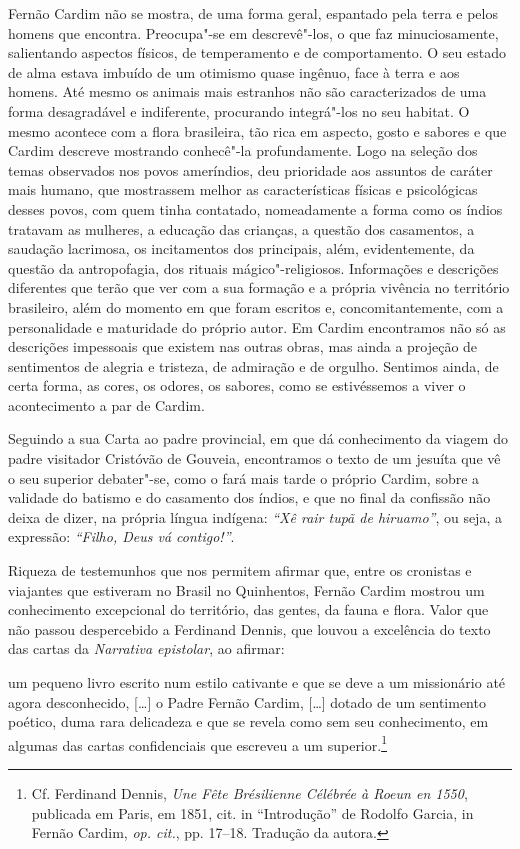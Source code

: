 Fernão Cardim não se mostra, de uma forma geral, espantado pela terra
e pelos homens que encontra. Preocupa"-se em descrevê"-los, o que faz
minuciosamente, salientando aspectos físicos, de temperamento e de
comportamento. O seu estado de alma estava imbuído de um otimismo
quase ingênuo, face à terra e aos homens. Até mesmo os animais mais
estranhos não são caracterizados de uma forma desagradável e
indiferente, procurando integrá"-los no seu habitat. O mesmo acontece
com a flora brasileira, tão rica em aspecto, gosto e sabores e que
Cardim descreve mostrando conhecê"-la profundamente. Logo na seleção
dos temas observados nos povos ameríndios, deu prioridade aos assuntos
de caráter mais humano, que mostrassem melhor as características
físicas e psicológicas desses povos, com quem tinha contatado,
nomeadamente a forma como os índios tratavam as mulheres, a educação
das crianças, a questão dos casamentos, a saudação lacrimosa, os
incitamentos dos principais, além, evidentemente, da questão da
antropofagia, dos rituais mágico"-religiosos. 
Informações e descrições diferentes que terão que ver com a sua
formação e a própria vivência no território brasileiro, além do momento
em que foram escritos e, concomitantemente, com a personalidade e
maturidade do próprio autor. Em Cardim encontramos não só as descrições
impessoais que existem nas outras obras, mas ainda a projeção de
sentimentos de alegria e tristeza, de admiração e de orgulho.
Sentimos ainda, de certa forma, as cores, os odores, os sabores, como
se estivéssemos a viver o acontecimento a par de Cardim.

Seguindo a sua Carta ao padre provincial, em que dá conhecimento da
viagem do padre visitador Cristóvão de Gouveia, encontramos o texto de
um jesuíta que vê o seu superior debater"-se, como o fará mais tarde o
próprio Cardim, sobre a validade do batismo e do casamento dos índios,
e que no final da confissão não deixa de dizer, na própria língua
indígena: \textit{``Xê rair tupã de hiruamo''}, ou seja, a expressão: \textit{``Filho, Deus vá contigo!''}. 

Riqueza de testemunhos que nos permitem afirmar que, entre os
cronistas e viajantes que estiveram no Brasil no Quinhentos, Fernão
Cardim mostrou um conhecimento excepcional do território, das gentes,
da fauna e flora. Valor que não passou despercebido a Ferdinand Dennis,
que louvou a excelência do texto das cartas da \textit{Narrativa
epistolar}, ao afirmar:

\begin{hedraquote}
um pequeno livro escrito num estilo cativante e que se deve a um missionário
até agora desconhecido, [\ldots] o Padre Fernão Cardim, [\ldots] dotado de um
sentimento poético, duma rara delicadeza e que se revela como sem seu
conhecimento, em algumas das cartas confidenciais que escreveu a um
superior.\footnote{ Cf. Ferdinand Dennis, \textit{Une Fête Brésilienne 
Célébrée à Roeun en 1550}, publicada em Paris, em 1851,
cit. in ``Introdução'' de Rodolfo Garcia, in Fernão Cardim, \textit{op. cit.}, 
pp. 17--18. Tradução da autora.} 
\end{hedraquote}


